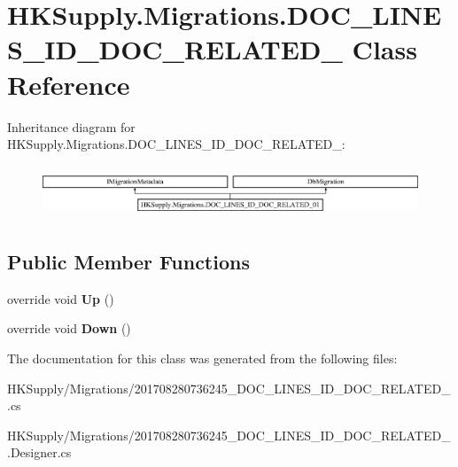 \hypertarget{class_h_k_supply_1_1_migrations_1_1_d_o_c___l_i_n_e_s___i_d___d_o_c___r_e_l_a_t_e_d__01}{}\section{H\+K\+Supply.\+Migrations.\+D\+O\+C\+\_\+\+L\+I\+N\+E\+S\+\_\+\+I\+D\+\_\+\+D\+O\+C\+\_\+\+R\+E\+L\+A\+T\+E\+D\+\_ Class Reference}
\label{class_h_k_supply_1_1_migrations_1_1_d_o_c___l_i_n_e_s___i_d___d_o_c___r_e_l_a_t_e_d__01}
Inheritance diagram for H\+K\+Supply.\+Migrations.\+D\+O\+C\+\_\+\+L\+I\+N\+E\+S\+\_\+\+I\+D\+\_\+\+D\+O\+C\+\_\+\+R\+E\+L\+A\+T\+E\+D\+\_\+:\begin{figure}[H]
\begin{center}
\leavevmode
\includegraphics[height=1.595442cm]{class_h_k_supply_1_1_migrations_1_1_d_o_c___l_i_n_e_s___i_d___d_o_c___r_e_l_a_t_e_d__01}
\end{center}
\end{figure}
\subsection*{Public Member Functions}
\begin{DoxyCompactItemize}
\item 
\mbox{\label{class_h_k_supply_1_1_migrations_1_1_d_o_c___l_i_n_e_s___i_d___d_o_c___r_e_l_a_t_e_d__01_a5d62e002875e634db22e1f0c7bc10be1}} 
override void {\bfseries Up} ()
\item 
\mbox{\label{class_h_k_supply_1_1_migrations_1_1_d_o_c___l_i_n_e_s___i_d___d_o_c___r_e_l_a_t_e_d__01_a5522c0f259113b8eae1ca5301ffd8406}} 
override void {\bfseries Down} ()
\end{DoxyCompactItemize}


The documentation for this class was generated from the following files\+:\begin{DoxyCompactItemize}
\item 
H\+K\+Supply/\+Migrations/201708280736245\+\_\+\+D\+O\+C\+\_\+\+L\+I\+N\+E\+S\+\_\+\+I\+D\+\_\+\+D\+O\+C\+\_\+\+R\+E\+L\+A\+T\+E\+D\+\_.\+cs\item 
H\+K\+Supply/\+Migrations/201708280736245\+\_\+\+D\+O\+C\+\_\+\+L\+I\+N\+E\+S\+\_\+\+I\+D\+\_\+\+D\+O\+C\+\_\+\+R\+E\+L\+A\+T\+E\+D\+\_.\+Designer.\+cs\end{DoxyCompactItemize}
